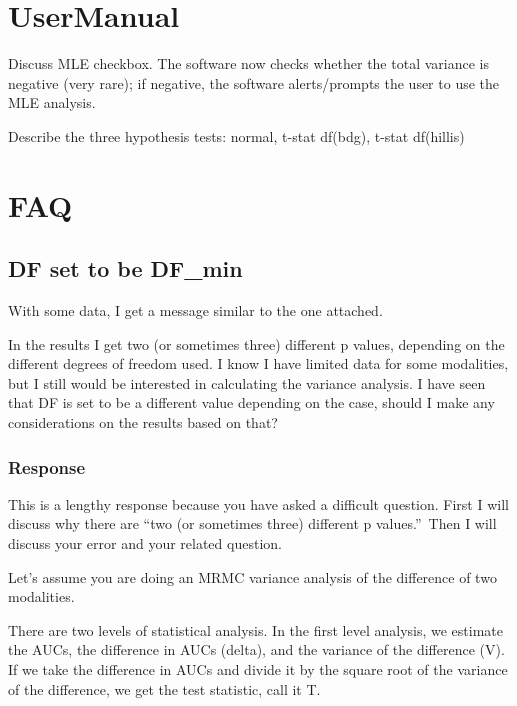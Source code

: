 \documentclass{article}%
\begin{document}
\section{\bigskip UserManual}

Discuss MLE checkbox. The software now checks whether the total variance is
negative (very rare); if negative, the software alerts/prompts the user to use
the MLE analysis.

\bigskip

Describe the three hypothesis tests: normal, t-stat df(bdg), t-stat df(hillis)

\bigskip

\section{FAQ}

\subsection{DF set to be DF\_min}

With some data, I get a message similar to the one attached.

In the results I get two (or sometimes three) different p values, depending on
the different degrees of freedom used. I know I have limited data for some
modalities, but I still would be interested in calculating the variance
analysis. I have seen that DF is set to be a different value depending on the
case, should I make any considerations on the results based on that?

\subsubsection{Response}

This is a lengthy response because you have asked a difficult question. First
I will discuss why there are \textquotedblleft two (or sometimes three)
different p values.\textquotedblright\ Then I will discuss your error and your
related question.

Let's assume you are doing an MRMC variance analysis of the difference of two modalities.

There are two levels of statistical analysis. In the first level analysis, we
estimate the AUCs, the difference in AUCs (delta), and the variance of the
difference (V). If we take the difference in AUCs and divide it by the square
root of the variance of the difference, we get the test statistic, call it T.
\end{document}

